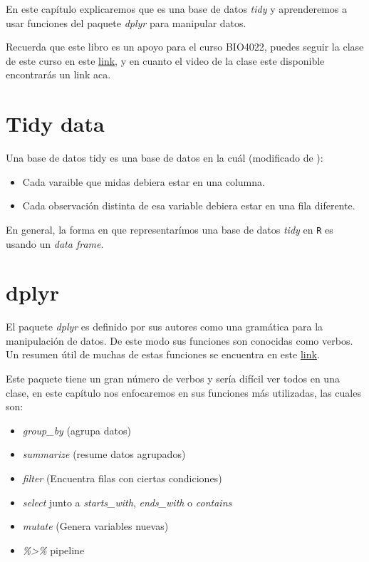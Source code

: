 \documentclass[]{book}
\providecommand{\tightlist}{%
  \setlength{\itemsep}{0pt}\setlength{\parskip}{0pt}}
\begin{document}
En este capítulo explicaremos que es una base de datos \emph{tidy}
\citep{wickham2014tidy} y aprenderemos a usar funciones del paquete
\emph{dplyr} \citep{R-dplyr} para manipular datos.

Recuerda que este libro es un apoyo para el curso BIO4022, puedes seguir
la clase de este curso en este
\href{https://derek-corcoran-barrios.github.io/Clase1/Clase1TidyData}{link},
y en cuanto el video de la clase este disponible encontrarás un link
aca.

\hypertarget{tidy-data}{%
\section{Tidy data}\label{tidy-data}}

Una base de datos tidy es una base de datos en la cuál (modificado de
\citep{leek2015elements}):

\begin{itemize}
\tightlist
\item
  Cada varaible que midas debiera estar en una columna.
\item
  Cada observación distinta de esa variable debiera estar en una fila
  diferente.
\end{itemize}

En general, la forma en que representarímos una base de datos
\emph{tidy} en \texttt{R} es usando un \emph{data frame}.

\hypertarget{dplyr}{%
\section{dplyr}\label{dplyr}}

El paquete \emph{dplyr} es definido por sus autores como una gramática
para la manipulación de datos. De este modo sus funciones son conocidas
como verbos. Un resumen útil de muchas de estas funciones se encuentra
en este
\href{https://www.rstudio.com/wp-content/uploads/2015/02/data-wrangling-cheatsheet.pdf}{link}.

Este paquete tiene un gran número de verbos y sería difícil ver todos en
una clase, en este capítulo nos enfocaremos en sus funciones más
utilizadas, las cuales son:

\begin{itemize}
\tightlist
\item
  \emph{group\_by} (agrupa datos)
\item
  \emph{summarize} (resume datos agrupados)
\item
  \emph{filter} (Encuentra filas con ciertas condiciones)
\item
  \emph{select} junto a \emph{starts\_with}, \emph{ends\_with} o
  \emph{contains}
\item
  \emph{mutate} (Genera variables nuevas)
\item
  \emph{\%\textgreater{}\%} pipeline
\end{itemize}
\end{document}
